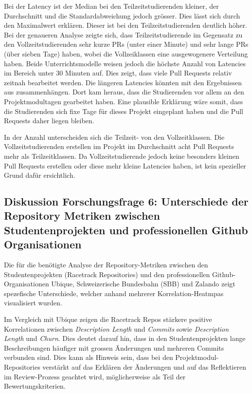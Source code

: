 Bei der Latency ist der Median bei den Teilzeitstudierenden kleiner, der Durchschnitt und die Standardabweichung jedoch grösser. Dies lässt sich durch den Maximalwert erklären. Dieser ist bei den Teilzeitstudierenden deutlich höher. Bei der genaueren Analyse zeigte sich, dass Teilzeitstudierende im Gegensatz zu den Vollzeitstudierenden sehr kurze PRs (unter einer Minute) und sehr lange PRs (über sieben Tage) haben, wobei die Vollzeiklassen eine ausgewogenere Verteilung haben. Beide Unterrichtsmodelle weisen jedoch die höchste Anzahl von Latencies im Bereich unter 30 Minuten auf. Dies zeigt, dass viele Pull Requests relativ zeitnah bearbeitet werden. Die längeren Latencies könnten mit den Ergebnissen aus  zusammenhängen. Dort kam heraus, dass die Studierenden vor allem an den Projektmodultagen gearbeitet haben. Eine plausible Erklärung wäre somit, dass die Studierenden sich fixe Tage für dieses Projekt eingeplant haben und die Pull Requests daher liegen bleiben.

In der Anzahl unterscheiden sich die Teilzeit- von den Vollzeitklassen. Die Vollzeitstudierenden erstellen im Projekt im Durchschnitt acht Pull Requests mehr als Teilzeitklassen. Da Vollzeitstudierende jedoch keine besonders kleinen Pull Requests erstellen oder diese mehr kleine Latencies haben, ist kein spezieller Grund dafür ersichtlich.

\subsection{Diskussion Forschungsfrage 6: Unterschiede der Repository Metriken zwischen Studentenprojekten und professionellen Github Organisationen}
Die für die  benötigte Analyse der Repository-Metriken zwischen den Studentenprojekten (Racetrack Repositories) und den professionellen Github-Organisationen Ubique, Schweizerische Bundesbahn (SBB) und Zalando zeigt spezefische Unterschiede, welcher anhand mehrerer Korrelation-Heatmpas visualisiert wurden. 

Im Vergleich mit Ubique zeigen die Racetrack Repos stärkere positive Korrelationen zwischen \textit{Description Length} und \textit{Commits} sowie \textit{Description Length} und \textit{Churn}. Dies deutet darauf hin, dass in den Studentenprojekten lange Beschreibungen häufiger mit grossen Änderungen und mehreren Commits verbunden sind. Dies kann als Hinweis sein, dass bei den Projektmodul-Repositories verstärkt auf das Erklären der Änderungen und auf das Reflektieren im Review-Prozess geachtet wird, möglicherweise als Teil der Bewertungskriterien. 

